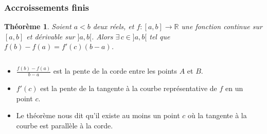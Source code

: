 \documentclass[10pt,notheorems]{beamer}
\theoremstyle{plain}
\newtheorem{theorem}{Théorème}
\theoremstyle{definition} %
\begin{document}
\begin{frame}
  \frametitle{Accroissements finis}
  \hypertarget{slide_accroissements_finis_1}{}

  \begin{theorem}\label{thm:accroissements_finis}
    Soient $a<b$ deux réels, et $f: [a,b]\rightarrow \mathbb R$ une fonction continue sur $[a, b]$ et dérivable sur $]a, b[$. Alors $\exists\, c\in]a, b[$ tel que $f(b)−f(a) = f'(c)(b−a)$.
  \end{theorem}

  \bigskip

  \begin{columns}[onlytextwidth]
    \begin{column}{0.5\textwidth}
      {\small
        \begin{itemize}
        \item $\frac{f(b)-f(a)}{b-a}$ est la pente de la corde entre les points $A$ et $B$.\newline
        \item $f'(c)$ est la pente de la tangente à la courbe représentative de $f$ en un point $c$.\newline
        \item Le théorème nous dit qu'il existe au moins un point $c$ où la tangente à la courbe est parallèle à la corde.
        \end{itemize}}
    \end{column}
    \begin{column}{0.5\textwidth}
      \begin{center}
        {\small
          }
\end{center}
\end{column}
\end{columns}
\end{frame}
\end{document}
